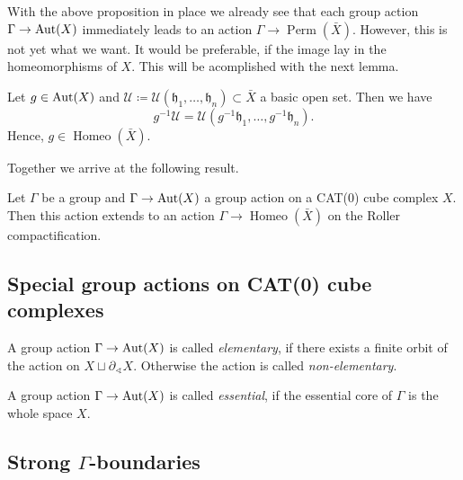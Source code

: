 With the above proposition in place we already see that each group action \(\Gamma \to \operatorname{Aut}(X)\) immediately leads to an action \(\Gamma \to \operatorname{Perm}(\bar X)\). However, this is not yet what we want. It would be preferable, if the image lay in the homeomorphisms of \(X\). This will be acomplished with the next lemma.

\begin{lemma}
  Let \(g \in \operatorname{Aut}(X)\) and \(\mathcal{U} \coloneqq \mathcal{U}(\mathfrak{h}_1, \dots, \mathfrak{h}_n) \subset \bar X\) a basic open set. Then we have
  \[
    g^{-1} \mathcal{U} = \mathcal{U}(g^{-1}\mathfrak{h}_1, \dots, g^{-1}\mathfrak{h}_n).
  \]
  Hence, \(g \in \operatorname{Homeo}(\bar X)\).
\end{lemma}

Together we arrive at the following result.

\begin{thm}
  \label{thm:roller-action}
  Let \(\Gamma\) be a group and \(\Gamma \to \operatorname{Aut}(X)\) a group action on a CAT(0) cube complex \(X\). Then this action extends to an action \(\Gamma \to \operatorname{Homeo}(\bar X)\) on the Roller compactification.
\end{thm}

\subsection{Special group actions on CAT(0) cube complexes}
\label{sec:special}

\begin{defin}
  A group action \(\Gamma \to \operatorname{Aut}(X)\) is called \emph{elementary}, if there exists a finite orbit of the action on \(X \sqcup \partial_{\sphericalangle}X\). Otherwise the action is called \emph{non-elementary}.
\end{defin}

\begin{defin}
  A group action \(\Gamma \to \operatorname{Aut}(X)\) is called \emph{essential}, if the essential core of \(\Gamma\) is the whole space \(X\).
\end{defin}

\subsection{Strong \(\Gamma\)-boundaries}
\label{sec:grp-boundary}

